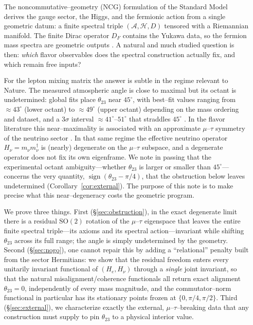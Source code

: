 \documentclass[11pt,a4paper]{article}
\theoremstyle{definition}
\newcommand{\He}{H_e}
\newcommand{\Hnu}{H_\nu}
\begin{document}
The noncommutative--geometry (NCG) formulation of the Standard Model
\cite{connes1994,connesCMP1996,cc1997,ccm2007} derives the gauge sector, the
Higgs, and the fermionic action from a single geometric datum: a finite spectral
triple $(\mathcal A,\mathcal H,D)$ tensored with a Riemannian manifold. The finite
Dirac operator $D_F$ contains the Yukawa data, so the fermion mass spectra are
geometric outputs \cite{vandenDungen2012,vanSuijlekom2015}. A natural and much
studied question is then: \emph{which} flavor observables does the spectral
construction actually fix, and which remain free inputs?

For the lepton mixing matrix the answer is subtle in the regime relevant to
Nature. The measured atmospheric angle is close to maximal but its octant is
undetermined: global fits place $\theta_{23}$ near $45^\circ$, with best--fit
values ranging from $\approx43^\circ$ (lower octant) to $\approx49^\circ$ (upper
octant) depending on the mass ordering and dataset, and a $3\sigma$ interval
$\approx41^\circ$--$51^\circ$ that straddles $45^\circ$ \cite{pdg,nufit6}. In the
flavor literature this near--maximality is associated with an approximate
$\mu$--$\tau$ symmetry of the neutrino sector
\cite{harrison2002,xingzhao2016,kingluhn2013}. In that same regime the effective
neutrino operator $\Hnu=m_\nu m_\nu^\dagger$ is (nearly) degenerate on the
$\mu$--$\tau$ subspace, and a degenerate operator does not fix its own eigenframe.
We note in passing that the experimental octant ambiguity---whether $\theta_{23}$
is larger or smaller than $45^\circ$---concerns the very quantity,
$\operatorname{sign}(\theta_{23}-\pi/4)$, that the obstruction below leaves
undetermined (Corollary~\ref{cor:external}). The purpose of this note is to make
precise what this near--degeneracy costs the geometric program.

We prove three things. First (\S\ref{sec:obstruction}), in the exact degenerate
limit there is a residual $\mathrm{SO}(2)$ rotation of the $\mu$--$\tau$ eigenspace
that leaves the entire finite spectral triple---its axioms and its spectral
action---invariant while shifting $\theta_{23}$ across its full range; the angle
is simply undetermined by the geometry. Second (\S\ref{sec:nogo}), one cannot
repair this by adding a ``relational'' penalty built from the sector Hermitians:
we show that the residual freedom enters every unitarily invariant functional of
$(\He,\Hnu)$ through a \emph{single} joint invariant, so that the natural
misalignment/coherence functionals all return exact alignment $\theta_{23}=0$,
independently of every mass magnitude, and the commutator--norm functional in
particular has its stationary points frozen at $\{0,\pi/4,\pi/2\}$. Third
(\S\ref{sec:external}), we characterize exactly the external, $\mu$--$\tau$--breaking
data that any construction must supply to pin $\theta_{23}$ to a physical interior
value.
\end{document}
